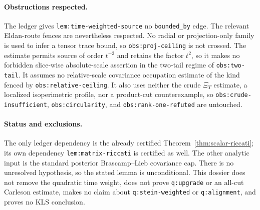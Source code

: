 \documentclass[../main.tex]{subfiles}
\begin{document}
\paragraph{Obstructions respected.}
The ledger gives \texttt{lem:time-weighted-source} no \texttt{bounded\_by} edge.  The relevant
Eldan-route fences are nevertheless respected.  No radial or projection-only family is used to
infer a tensor trace bound, so \texttt{obs:proj-ceiling} is not crossed.  The estimate permits
source of order $t^{-2}$ and retains the factor $t^2$, so it makes no forbidden slice-wise
absolute-scale assertion in the two-tail regime of \texttt{obs:two-tail}.  It assumes no
relative-scale covariance occupation estimate of the kind fenced by
\texttt{obs:relative-ceiling}.  It also uses neither the crude $\Xi_T$ estimate, a localized
isoperimetric profile, nor a product-cut counterexample, so
\texttt{obs:crude-insufficient}, \texttt{obs:circularity}, and
\texttt{obs:rank-one-refuted} are untouched.

\paragraph{Status and exclusions.}
The only ledger dependency is the already certified Theorem~\ref{thm:scalar-riccati}; its own
dependency \texttt{lem:matrix-riccati} is certified as well.  The other analytic input is the
standard posterior Brascamp--Lieb covariance cap.  There is no unresolved hypothesis, so the
stated lemma is unconditional.  This dossier does not remove the quadratic time weight, does
not prove \texttt{q:upgrade} or an all-cut Carleson estimate, makes no claim about
\texttt{q:stein-weighted} or \texttt{q:alignment}, and proves no KLS conclusion.
\end{document}
